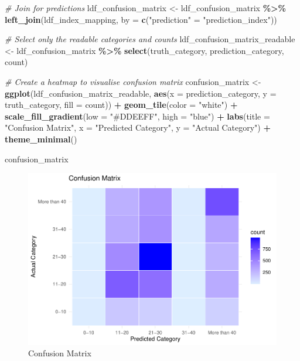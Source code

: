 \documentclass[
]{article}
\newenvironment{Shaded}{\begin{snugshade}}{\end{snugshade}}
\newcommand{\AttributeTok}[1]{\textcolor[rgb]{0.13,0.29,0.53}{#1}}
\newcommand{\CommentTok}[1]{\textcolor[rgb]{0.56,0.35,0.01}{\textit{#1}}}
\newcommand{\FunctionTok}[1]{\textcolor[rgb]{0.13,0.29,0.53}{\textbf{#1}}}
\newcommand{\NormalTok}[1]{#1}
\newcommand{\OtherTok}[1]{\textcolor[rgb]{0.56,0.35,0.01}{#1}}
\newcommand{\SpecialCharTok}[1]{\textcolor[rgb]{0.81,0.36,0.00}{\textbf{#1}}}
\newcommand{\StringTok}[1]{\textcolor[rgb]{0.31,0.60,0.02}{#1}}
\begin{document}
\begin{Shaded}
\begin{Highlighting}[]
\CommentTok{\# Join for predictions}
\NormalTok{ldf\_confusion\_matrix }\OtherTok{\textless{}{-}}\NormalTok{ ldf\_confusion\_matrix }\SpecialCharTok{\%\textgreater{}\%}
  \FunctionTok{left\_join}\NormalTok{(ldf\_index\_mapping, }\AttributeTok{by =} \FunctionTok{c}\NormalTok{(}\StringTok{"prediction"} \OtherTok{=} \StringTok{"prediction\_index"}\NormalTok{))}

\CommentTok{\# Select only the readable categories and counts}
\NormalTok{ldf\_confusion\_matrix\_readable }\OtherTok{\textless{}{-}}\NormalTok{ ldf\_confusion\_matrix }\SpecialCharTok{\%\textgreater{}\%}
  \FunctionTok{select}\NormalTok{(truth\_category, }
\NormalTok{    prediction\_category, }
\NormalTok{    count)}

\CommentTok{\# Create a heatmap to visualise confusion matrix }
\NormalTok{confusion\_matrix }\OtherTok{\textless{}{-}} \FunctionTok{ggplot}\NormalTok{(ldf\_confusion\_matrix\_readable, }\FunctionTok{aes}\NormalTok{(}\AttributeTok{x =}\NormalTok{ prediction\_category, }\AttributeTok{y =}\NormalTok{ truth\_category, }\AttributeTok{fill =}\NormalTok{ count)) }\SpecialCharTok{+}
  \FunctionTok{geom\_tile}\NormalTok{(}\AttributeTok{color =} \StringTok{"white"}\NormalTok{) }\SpecialCharTok{+}
  \FunctionTok{scale\_fill\_gradient}\NormalTok{(}\AttributeTok{low =} \StringTok{"\#DDEEFF"}\NormalTok{, }\AttributeTok{high =} \StringTok{"blue"}\NormalTok{) }\SpecialCharTok{+}
  \FunctionTok{labs}\NormalTok{(}\AttributeTok{title =} \StringTok{"Confusion Matrix"}\NormalTok{,}
    \AttributeTok{x =} \StringTok{"Predicted Category"}\NormalTok{,}
    \AttributeTok{y =} \StringTok{"Actual Category"}\NormalTok{) }\SpecialCharTok{+}
  \FunctionTok{theme\_minimal}\NormalTok{()}

\NormalTok{confusion\_matrix}
\end{Highlighting}
\end{Shaded}

\begin{figure}

{\centering \includegraphics[width=0.9\linewidth]{B273025_final_big_data_rmd_final_files/figure-latex/unnamed-chunk-11-1} 

}

\caption{Confusion Matrix}\label{fig:unnamed-chunk-11}
\end{figure}
\end{document}
